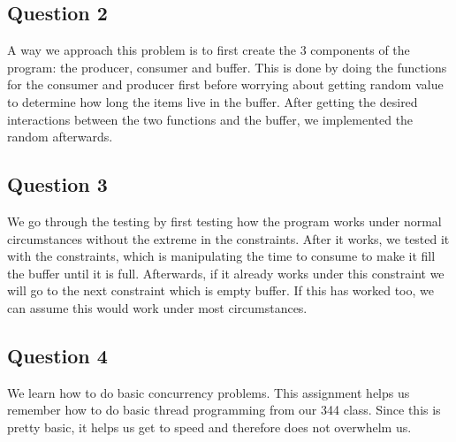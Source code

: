 \documentclass[10pt,draftclsnofoot,onecolumn, compsoc]{IEEEtran}
\begin{document}
\subsection{Question 2}
A way we approach this problem is to first create the 3 components of the program: the producer, consumer and buffer. This is done by doing the functions for the consumer and producer first before worrying about getting random value to determine how long the items live in the buffer. After getting the desired interactions between the two functions and the buffer, we implemented the random afterwards.
\subsection{Question 3}
We go through the testing by first testing how the program works under normal circumstances without the extreme in the constraints. After it works, we tested it with the constraints, which is manipulating the time to consume to make it fill the buffer until it is full. Afterwards, if it already works under this constraint we will go to the next constraint which is empty buffer. If this has worked too, we can assume this would work under most circumstances.
\subsection{Question 4}
We learn how to do basic concurrency problems. This assignment helps us remember how to do basic thread programming from our 344 class. Since this is pretty basic, it helps us get to speed and therefore does not overwhelm us.
\end{document}

